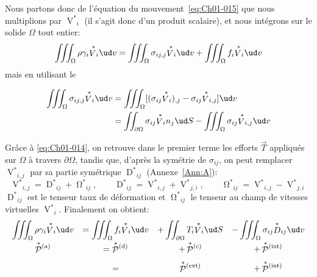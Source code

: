 Nous partons donc de l'équation du mouvement~\eqref{eq:Ch01-015} que nous multiplions par $\displaystyle{\mathop{V}^{*}}_i$ (il s'agit donc d'un produit scalaire), et nous intégrons sur le solide $\Omega$ tout entier:
\begin{equation*}
    \iiint_{\Omega}\rho\gamma_i {\mathop{V}^{*}}_i \ud v=\iiint_{\Omega}\sigma_{ij,j} {\mathop{V}^{*}}_i \ud v+\iiint_{\Omega}f_i {\mathop{V}^{*}}_i \ud v
\end{equation*}
mais en utilisant le
\begin{thmn}
\begin{align*}
    \iiint_{\Omega}\sigma_{ij,j} {\mathop{V}^{*}}_i \ud v &= \iiint_{\Omega}[(\sigma_{ij} {\mathop{V}^{*}}_i)_{,j}-\sigma_{ij} {\mathop{V}^{*}}_{i,j}]\ud v\\
    &=\iint_{\partial \Omega}\sigma_{ij} {\mathop{V}^{*}}_i n_j \ud S-\iiint_{\Omega} \sigma_{ij} {\mathop{V}^{*}}_{i,j} \ud v
\end{align*}
\end{thmn}
Grâce à \eqref{eq:Ch01-014}, on retrouve dans le premier terme les efforts $\vec{T}$ appliqués sur $\Omega$ à travers $\partial \Omega$, tandis que, d'après la symétrie de $\sigma_{ij}$, on peut remplacer $\displaystyle{\mathop{V}^{*}}_{i,j}$ par sa partie symétrique $\displaystyle{\mathop{D}^{*}}_{ij}$ (Annexe~\ref{Ann:A}):
\begin{equation}
    {\mathop{V}^{{\ast}}}_{i,j}={\mathop{D}^{{\ast}}}_{ij}+{\mathop{\Omega}^{{\ast}}}_{ij},\qquad
    {\mathop{D}^{{\ast}}}_{ij}={\mathop{V}^{{\ast}}}_{i,j}+{\mathop{V}^{{\ast}}}_{j,i},\qquad
    {\mathop{\Omega}^{{\ast}}}_{ij}={\mathop{V}^{{\ast}}}_{i,j}-{\mathop{V}^{{\ast}}}_{j,i}
    \label{eq:Ch01-023}
\end{equation}
$\displaystyle{\mathop{D}^{{\ast}}}_{ij}$ est le tenseur taux de déformation et $\displaystyle{\mathop{\Omega}^{{\ast}}}_{ij}$ le tenseur au champ de vitesses virtuelles $\displaystyle{\mathop{V}^{{\ast}}}_i$.
Finalement on obtient:
\begin{equation}
    \everymath{\displaystyle}
    \begin{array}{cccc}
        \iiint_{\Omega}\rho\gamma_i {\mathop{V}^{\ast}}_i \ud v & = \iiint_{\Omega}f_i {\mathop{V}^{\ast}}_i \ud v & +                                                    \iint_{\partial\Omega}T_i {\mathop{V}^{\ast}}_i \ud S & -                           \iiint_{\Omega}\sigma_{ij} {\mathop{D}^{\ast}}_{ij} \ud v\\[7pt]
        \mathop{\mathcal{P}}^{\ast}{\!}^{(\text{a})} & = \mathop{\mathcal{P}}^{\ast}{\!}^{(\text{d})} & + \mathop{\mathcal{P}}^{\ast}{\!}^{(\text{c})} & + \mathop{\mathcal{P}}^{\ast}{\!}^{(\text{int})}\\[7pt]
        & =  & \mathop{\mathcal{P}}^{\ast}{\!}^{(\text{ext})} & + \mathop{\mathcal{P}}^{\ast}{\!}^{(\text{int})}
    \end{array}
    \label{eq:Ch01-024}
\end{equation}
